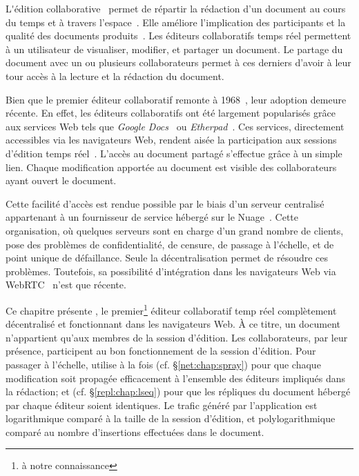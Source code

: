 
\lettrine{L}'édition collaborative~\cite{ellis1989concurrency,
  johansen1988groupware} permet de répartir la rédaction d'un document au cours
du temps et à travers l'espace~\cite{desanctis1987foundation,
  grudin1994computersupported, johansen1988groupware}. Elle améliore
l'implication des participants et la qualité des documents
produits~\cite{giles2005internet, noel2004empirical}. Les éditeurs collaboratifs
temps réel permettent à un utilisateur de visualiser, modifier, et partager un
document. Le partage du document avec un ou plusieurs collaborateurs permet à
ces derniers d'avoir à leur tour accès à la lecture et la rédaction du document.

Bien que le premier éditeur collaboratif remonte à
1968~\cite{engelbart1968research}, leur adoption demeure récente. En effet, les
éditeurs collaboratifs ont été largement popularisés grâce aux services Web tels
que \emph{Google Docs}~\cite{googledocs} ou \emph{Etherpad}~\cite{etherpad}. Ces
services, directement accessibles via les navigateurs Web, rendent aisée la
participation aux sessions d'édition temps réel~\cite{mogan2010impact}. L'accès
au document partagé s'effectue grâce à un simple lien. Chaque modification
apportée au document est visible des collaborateurs ayant ouvert le document.

Cette facilité d'accès est rendue possible par le biais d'un serveur centralisé
appartenant à un fournisseur de service hébergé sur le
Nuage~\cite{mell2011national}. Cette organisation, où quelques serveurs sont en
charge d'un grand nombre de clients, pose des problèmes de confidentialité,
de censure, de passage à l'échelle, et de point unique de défaillance. Seule la
décentralisation permet de résoudre ces problèmes. Toutefois, sa possibilité
d'intégration dans les navigateurs Web via WebRTC~\cite{webrtc} n'est que
récente.


Ce chapitre présente \CRATE, le premier\footnote{à notre connaissance} éditeur
collaboratif temp réel complètement décentralisé et fonctionnant dans les
navigateurs Web. À ce titre, un document n'appartient qu'aux membres de la
session d'édition. Les collaborateurs, par leur présence, participent au bon
fonctionnement de la session d'édition. Pour passager à l'échelle, \CRATE
utilise à la fois \SPRAY (cf. §\ref{net:chap:spray}) pour que chaque
modification soit propagée efficacement à l'ensemble des éditeurs impliqués dans
la rédaction; et \LSEQ (cf. §\ref{repl:chap:lseq}) pour que les répliques du
document hébergé par chaque éditeur soient identiques. Le trafic généré par
l'application est logarithmique comparé à la taille de la session d'édition, et
polylogarithmique comparé au nombre d'insertions effectuées dans le document.

